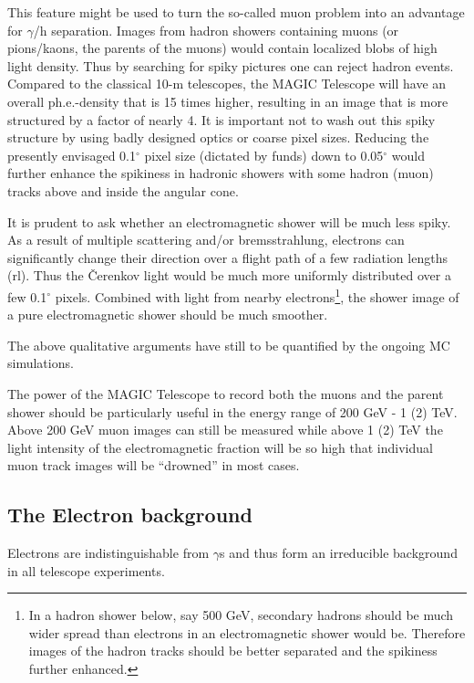 \begin{itemize}
This feature might be used to turn the so-called muon problem into an advantage
for $\gamma $/h separation. Images from hadron showers containing muons (or
pions/kaons, the parents of the muons) would contain localized blobs of high light
density. Thus by searching for spiky pictures one can reject hadron events.
Compared to the classical 10-m telescopes, the MAGIC Telescope will have an overall
ph.e.-density that is 15 times higher, resulting in an image that is more
structured by a factor of nearly 4. It is important not to wash out this
spiky structure by using badly designed optics or coarse pixel sizes.
Reducing the presently envisaged 0.1$^{\circ }$ pixel size (dictated by funds) down to
0.05$^{\circ }$ would further enhance the spikiness in hadronic showers with
some hadron (muon) tracks above and inside the angular cone.

It is prudent to ask whether an electromagnetic shower will be much less
spiky. 
As a result of multiple
scattering and/or bremsstrahlung, electrons can significantly change their
direction over a flight path of a few radiation lengths (rl). 
Thus the \v{C}erenkov light would be much
more uniformly distributed over a few 0.1$^{\circ }$ pixels. Combined with
light from nearby electrons\footnote{%
In a hadron shower below, say 500 GeV, secondary hadrons should be much
wider spread than electrons in an electromagnetic shower would be. Therefore
images of the hadron tracks should be better separated and the spikiness
further enhanced.}, the shower image of a pure electromagnetic shower should be much
smoother.

The above qualitative arguments have still to be quantified by the ongoing MC
simulations.

The power of the MAGIC Telescope to record both the muons and the parent shower should be
particularly useful in the energy range of 200 GeV - 1 (2) TeV. Above 200
GeV  muon images can still be measured
while above 1 (2) TeV
the light intensity  of the electromagnetic fraction 
will be so high that individual muon track images will
be ``drowned'' in most cases.
\end{itemize}

\subsection{The Electron background}


\medskip Electrons are indistinguishable from $\gamma$s and thus form an
irreducible background in all 
\Cerenkov telescope experiments. 

